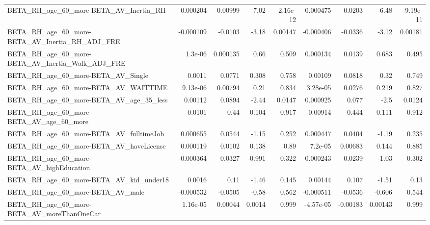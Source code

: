 \begin{tabular}{lrrrrrrrr}
BETA\_RH\_age\_60\_more-BETA\_AV\_Inertia\_RH             &   -0.000204 &     -0.00999 &    -7.02 & 2.16e-12 &  -0.000475 &     -0.0203 &        -6.48 &      9.19e-11 \\
BETA\_RH\_age\_60\_more-BETA\_AV\_Inertia\_RH\_ADJ\_FRE     &   -0.000109 &      -0.0103 &    -3.18 &  0.00147 &  -0.000406 &     -0.0336 &        -3.12 &       0.00181 \\
BETA\_RH\_age\_60\_more-BETA\_AV\_Inertia\_Walk\_ADJ\_FRE   &     1.3e-06 &     0.000135 &     0.66 &    0.509 &   0.000134 &      0.0139 &        0.683 &         0.495 \\
BETA\_RH\_age\_60\_more-BETA\_AV\_Single                 &      0.0011 &       0.0771 &    0.308 &    0.758 &    0.00109 &      0.0818 &         0.32 &         0.749 \\
BETA\_RH\_age\_60\_more-BETA\_AV\_WAITTIME               &    9.13e-06 &      0.00794 &     0.21 &    0.834 &   3.28e-05 &      0.0276 &        0.219 &         0.827 \\
BETA\_RH\_age\_60\_more-BETA\_AV\_age\_35\_less            &     0.00112 &       0.0894 &    -2.44 &   0.0147 &   0.000925 &       0.077 &         -2.5 &        0.0124 \\
BETA\_RH\_age\_60\_more-BETA\_AV\_age\_60\_more            &      0.0101 &         0.44 &    0.104 &    0.917 &    0.00914 &       0.444 &        0.111 &         0.912 \\
BETA\_RH\_age\_60\_more-BETA\_AV\_fulltimeJob            &    0.000655 &       0.0544 &    -1.15 &    0.252 &   0.000447 &      0.0404 &        -1.19 &         0.235 \\
BETA\_RH\_age\_60\_more-BETA\_AV\_haveLicense            &    0.000119 &       0.0102 &    0.138 &     0.89 &    7.2e-05 &     0.00683 &        0.144 &         0.885 \\
BETA\_RH\_age\_60\_more-BETA\_AV\_highEducation          &    0.000364 &       0.0327 &   -0.991 &    0.322 &   0.000243 &      0.0239 &        -1.03 &         0.302 \\
BETA\_RH\_age\_60\_more-BETA\_AV\_kid\_under18            &      0.0016 &         0.11 &    -1.46 &    0.145 &    0.00144 &       0.107 &        -1.51 &          0.13 \\
BETA\_RH\_age\_60\_more-BETA\_AV\_male                   &   -0.000532 &      -0.0505 &    -0.58 &    0.562 &  -0.000511 &     -0.0536 &       -0.606 &         0.544 \\
BETA\_RH\_age\_60\_more-BETA\_AV\_moreThanOneCar         &    1.16e-05 &      0.00044 &   0.0014 &    0.999 &  -4.57e-05 &    -0.00183 &      0.00143 &         0.999 \\

\end{tabular}
